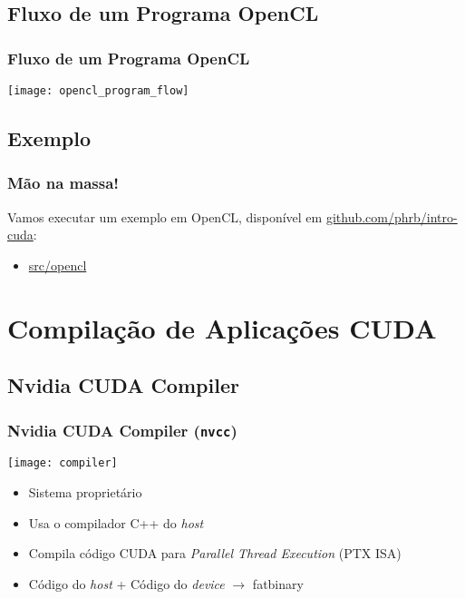 \documentclass[10pt, compress]{beamer}
\begin{document}
\subsection{Fluxo de um Programa OpenCL}

\begin{frame}
    \frametitle{Fluxo de um Programa OpenCL}
    \begin{center}
        \texttt{[image: opencl\_program\_flow]}
    \end{center}
\end{frame}

\subsection{Exemplo}

\begin{frame}
    \frametitle{Mão na massa!}
    Vamos executar um exemplo em OpenCL,
    disponível em \url{github.com/phrb/intro-cuda}:
    \begin{itemize}
        \item \url{src/opencl}
    \end{itemize}
\end{frame}

\section{Compilação de Aplicações CUDA}

\subsection{Nvidia CUDA Compiler}

\begin{frame}
    \frametitle{Nvidia CUDA Compiler (\texttt{nvcc})}
    \begin{center}
        \texttt{[image: compiler]}
    \end{center}
    \begin{itemize}
        \item Sistema \alert{proprietário}
        \item Usa o compilador C++ do \textit{host}
        \item Compila código CUDA para \textit{Parallel Thread Execution} (\alert{PTX} ISA)
        \item Código do \textit{host} + Código do \textit{device} $\rightarrow$ \alert{fatbinary}
    \end{itemize}
\end{frame}
\end{document}
